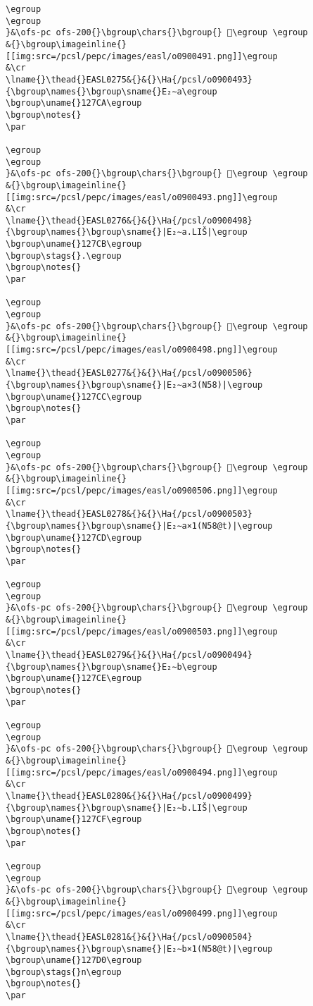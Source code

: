 \begin{verbatim}
\egroup
\egroup
}&\ofs-pc ofs-200{}\bgroup\chars{}\bgroup{} 󲞩\egroup \egroup
&{}\bgroup\imageinline{}[[img:src=/pcsl/pepc/images/easl/o0900491.png]]\egroup
&\cr
\lname{}\thead{}EASL0275&{}&{}\Ha{/pcsl/o0900493}{\bgroup\names{}\bgroup\sname{}E₂∼a\egroup
\bgroup\uname{}127CA\egroup
\bgroup\notes{}
\par 

\egroup
\egroup
}&\ofs-pc ofs-200{}\bgroup\chars{}\bgroup{} 𒟊\egroup \egroup
&{}\bgroup\imageinline{}[[img:src=/pcsl/pepc/images/easl/o0900493.png]]\egroup
&\cr
\lname{}\thead{}EASL0276&{}&{}\Ha{/pcsl/o0900498}{\bgroup\names{}\bgroup\sname{}|E₂∼a.LIŠ|\egroup
\bgroup\uname{}127CB\egroup
\bgroup\stags{}.\egroup
\bgroup\notes{}
\par 

\egroup
\egroup
}&\ofs-pc ofs-200{}\bgroup\chars{}\bgroup{} 𒟋\egroup \egroup
&{}\bgroup\imageinline{}[[img:src=/pcsl/pepc/images/easl/o0900498.png]]\egroup
&\cr
\lname{}\thead{}EASL0277&{}&{}\Ha{/pcsl/o0900506}{\bgroup\names{}\bgroup\sname{}|E₂∼a×3(N58)|\egroup
\bgroup\uname{}127CC\egroup
\bgroup\notes{}
\par 

\egroup
\egroup
}&\ofs-pc ofs-200{}\bgroup\chars{}\bgroup{} 𒟌\egroup \egroup
&{}\bgroup\imageinline{}[[img:src=/pcsl/pepc/images/easl/o0900506.png]]\egroup
&\cr
\lname{}\thead{}EASL0278&{}&{}\Ha{/pcsl/o0900503}{\bgroup\names{}\bgroup\sname{}|E₂∼a×1(N58@t)|\egroup
\bgroup\uname{}127CD\egroup
\bgroup\notes{}
\par 

\egroup
\egroup
}&\ofs-pc ofs-200{}\bgroup\chars{}\bgroup{} 𒟍\egroup \egroup
&{}\bgroup\imageinline{}[[img:src=/pcsl/pepc/images/easl/o0900503.png]]\egroup
&\cr
\lname{}\thead{}EASL0279&{}&{}\Ha{/pcsl/o0900494}{\bgroup\names{}\bgroup\sname{}E₂∼b\egroup
\bgroup\uname{}127CE\egroup
\bgroup\notes{}
\par 

\egroup
\egroup
}&\ofs-pc ofs-200{}\bgroup\chars{}\bgroup{} 𒟎\egroup \egroup
&{}\bgroup\imageinline{}[[img:src=/pcsl/pepc/images/easl/o0900494.png]]\egroup
&\cr
\lname{}\thead{}EASL0280&{}&{}\Ha{/pcsl/o0900499}{\bgroup\names{}\bgroup\sname{}|E₂∼b.LIŠ|\egroup
\bgroup\uname{}127CF\egroup
\bgroup\notes{}
\par 

\egroup
\egroup
}&\ofs-pc ofs-200{}\bgroup\chars{}\bgroup{} 𒟏\egroup \egroup
&{}\bgroup\imageinline{}[[img:src=/pcsl/pepc/images/easl/o0900499.png]]\egroup
&\cr
\lname{}\thead{}EASL0281&{}&{}\Ha{/pcsl/o0900504}{\bgroup\names{}\bgroup\sname{}|E₂∼b×1(N58@t)|\egroup
\bgroup\uname{}127D0\egroup
\bgroup\stags{}n\egroup
\bgroup\notes{}
\par 


\end{verbatim}
